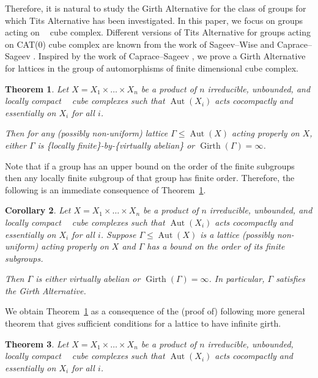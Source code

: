 \documentclass{amsart}
\theoremstyle{definition}
\newtheorem*{Notation warning}{Warning on notations}
\newtheorem*{Sketch of proof}{Sketch of proof for Theorem C}
\newtheorem{thmintro}{Theorem}
\newtheorem{corintro}[thmintro]{Corollary}
\DeclareMathOperator{\cat}{CAT(0)}
\DeclareMathOperator{\Gir}{Girth}
\def\aut{\mathop{\mathrm{Aut}}\nolimits}
\begin{document}
\begin{sloppypar}
Therefore, it is natural to study the Girth Alternative for the class of groups for which Tits Alternative has been investigated. 
In this paper, we focus on groups acting on $\cat$ cube complex. 
Different versions of Tits Alternative for groups acting on CAT(0) cube complex are known from the work of  Sageev--Wise \cite{sageev_wise_2005} and  Caprace--Sageev \cite{Caprace_2011}. Inspired by the work of Caprace--Sageev \cite{Caprace_2011}, we prove a Girth Alternative for lattices in the group of automorphisms of finite dimensional cube complex.

\begin{thmintro}\label{intro:v2}
    \emph{Let $X = X_1 \times \dots \times X_n$ be a product of $n$ irreducible, unbounded, and locally compact $\cat$ cube complexes such that $\aut(X_i)$ acts cocompactly and essentially on $X_i$ for all $i$.}       
      
      \emph{Then for any (possibly non-uniform) lattice $\Gamma \leq \aut(X)$ acting properly  on $X$, 
either $\Gamma$ is \{locally finite\}-by-\{virtually abelian\} or 
$\Gir(\Gamma)=\infty$.}
\end{thmintro}

Note that if a group has an upper bound on the order of the finite subgroups then any locally finite subgroup of that group has finite order. Therefore, the following is an immediate consequence of Theorem~\ref{intro:v2}.
\begin{corintro}\label{intro:v3}  
\emph{Let $X = X_1 \times \dots \times X_n$ be a product of $n$ irreducible, unbounded, and locally compact $\cat$ cube complexes such that $\aut(X_i)$ acts cocompactly and essentially on $X_i$ for all $i$.       
         Suppose $\Gamma \leq \aut(X)$ is a lattice (possibly non-uniform) acting properly on $X$ and $\Gamma$ has a bound on the order of its  finite subgroups.}

\emph{Then  $\Gamma$ is either virtually abelian or 
$\Gir(\Gamma)=\infty$. In particular, $\Gamma$ satisfies the Girth Alternative.}
\end{corintro}
We obtain Theorem~\ref{intro:v2} as a consequence of the (proof of) following more general theorem that gives  sufficient conditions for a lattice to have infinite girth.

\begin{thmintro}\label{intro:v1}
  \emph{Let $X = X_1 \times \dots \times X_n$ be a product of $n$ irreducible, unbounded, locally compact $\cat$ cube complexes such that $\aut(X_i)$ acts cocompactly and essentially on $X_i$ for all $i$.}


\end{thmintro}
\end{sloppypar}
\end{document}
